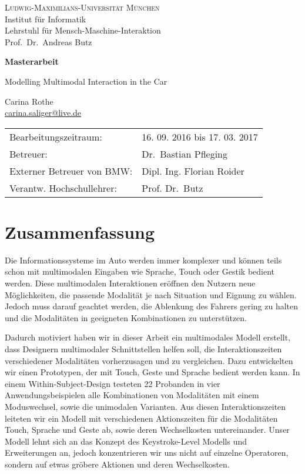 \documentclass[11pt,a4paper,twoside]{book}
\begin{document}
\pagestyle{empty} %

\begin{center}
\textsc{Ludwig-Maximilians-Universität München}\\
Institut für Informatik\\
Lehrstuhl für Mensch-Maschine-Interaktion\\
Prof.\ Dr.\ Andreas Butz

\vspace{5cm}
{\large\textbf{Masterarbeit}}\vspace{.5cm}

{\LARGE Modelling Multimodal Interaction in the Car}\vspace{1cm}

{\large Carina Rothe}\\\href{carina.saliger@live.de}{carina.saliger@live.de}

\end{center}
\vfill

\begin{tabular}{ll}
Bearbeitungszeitraum: & 16. 09. 2016 bis 17. 03. 2017\\
Betreuer: & Dr.\ Bastian Pfleging \\
Externer Betreuer von BMW: & Dipl. Ing. Florian Roider\\
Verantw. Hochschullehrer: & Prof. Dr.\ Butz 
\end{tabular}
\cleardoublepage
\chapter*{Zusammenfassung}
Die Informationssysteme im Auto werden immer komplexer und können teils schon mit multimodalen Eingaben wie Sprache, Touch oder Gestik bedient werden. Diese multimodalen Interaktionen eröffnen den Nutzern neue Möglichkeiten, die passende Modalität je nach Situation und Eignung zu wählen. Jedoch muss darauf geachtet werden, die Ablenkung des Fahrers gering zu halten und die Modalitäten in geeigneten Kombinationen zu unterstützen.

Dadurch motiviert haben wir in dieser Arbeit ein multimodales Modell erstellt, dass Designern  multimodaler Schnittstellen helfen soll, die Interaktionszeiten verschiedener Modalitäten vorherzusagen und zu vergleichen. Dazu entwickelten wir einen Prototypen, der mit Touch, Geste und Sprache bedient werden kann. In einem Within-Subject-Design testeten 22 Probanden in vier Anwendungsbeispielen alle Kombinationen von Modalitäten mit einem Moduswechsel, sowie die unimodalen Varianten. Aus diesen Interaktionszeiten leiteten wir ein Modell mit verschiedenen Aktionszeiten für die Modalitäten Touch, Sprache und Geste ab, sowie deren Wechselkosten untereinander. 
Unser Modell lehnt sich an das Konzept des Keystroke-Level Modells und Erweiterungen an, jedoch konzentrieren wir uns nicht auf einzelne Operatoren, sondern auf etwas gröbere Aktionen und deren Wechselkosten. 
\end{document}
